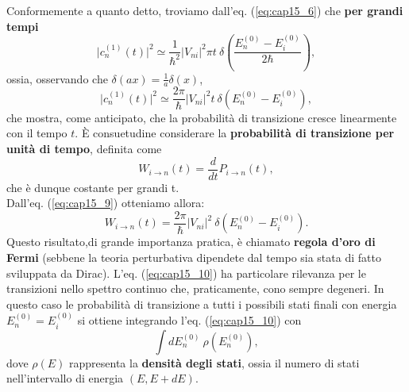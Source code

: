 \documentclass[a4paper,12pt,oneside]{book}
\begin{document}
Conformemente a quanto detto, troviamo dall'eq. (\ref{eq:cap15_6}) che \textbf{per grandi tempi}
\begin{equation}
\vert c_n ^{(1)} (t) \vert ^2 \simeq \frac{1}{\hbar ^2} \vert V_{ni} \vert ^2 \pi t\ \delta\left(\frac{E_n ^{(0)}-E_i ^{(0)}}{2\hbar} \right),
\end{equation}
ossia, osservando che $\delta (ax) = \frac{1}{a} \delta (x)$,
\begin{equation}
\vert c_n ^{(1)} (t) \vert ^2 \simeq \frac{2\pi}{\hbar } \vert V_{ni} \vert ^2  t\ \delta (E_n ^{(0)}-E_i ^{(0)} ),
\label{eq:cap15_9}
\end{equation}
che mostra, come anticipato, che la probabilità di transizione cresce linearmente con il tempo $t$.
È consuetudine considerare la \textbf{probabilità di transizione per unità di tempo}, definita come
\begin{equation}
W_{i\rightarrow n} (t) =\frac{d}{dt} P_{i\rightarrow n} (t),
\end{equation}
che è dunque costante per grandi t.\\
Dall'eq. (\ref{eq:cap15_9}) otteniamo allora:
\begin{equation}
W_{i\rightarrow n} (t) = \frac{2\pi}{\hbar } \vert V_{ni} \vert ^2\ \delta (E_n ^{(0)}-E_i ^{(0)} ).
\label{eq:cap15_10}
\end{equation}
Questo risultato,di grande importanza pratica, è chiamato \textbf{regola d'oro di Fermi} (sebbene la teoria perturbativa dipendete dal tempo sia stata di fatto sviluppata da Dirac).		
L'eq. (\ref{eq:cap15_10}) ha particolare rilevanza per le transizioni nello spettro continuo che, praticamente, cono sempre degeneri. In questo caso le probabilità di transizione a tutti i possibili stati finali con energia $E_n ^{(0)}= E_i ^{(0)}$ si ottiene integrando l'eq. (\ref{eq:cap15_10}) con
\begin{equation}
\int dE_n ^{(0)} \ \rho (E_n ^{(0)}),
\end{equation}
dove $\rho (E)$ rappresenta la \textbf{densità degli stati}, ossia il numero di stati nell'intervallo di energia $(E, E+dE)$.
\end{document}
